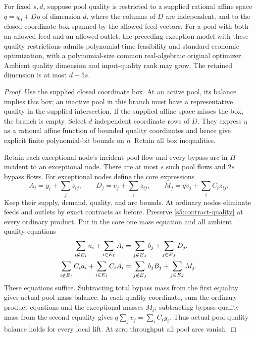 \begin{lemma}
\label{s5:quality-chart}
For fixed $s,d$, suppose pool quality is restricted to a supplied rational
affine space $q=q_0+D\eta$ of dimension $d$, where the columns of $D$
are independent, and to the closed coordinate box spanned by the allowed
feed vectors. For a pool with both an allowed feed and an allowed outlet,
the preceding exception model with these quality restrictions admits polynomial-time
feasibility and standard economic optimization, with a polynomial-size
common real-algebraic original optimizer. Ambient quality dimension and
input-quality rank may grow. The retained dimension is at most $d+5s$.
\end{lemma}
\begin{proof}
Use the supplied closed coordinate box. At an active pool, its balance
implies this box; an inactive pool in this branch must have
a representative quality in the supplied intersection. If the
supplied affine space misses the box, the branch is empty. Select $d$
independent coordinate rows of $D$. They express $\eta$ as a rational
affine function of bounded quality coordinates and hence give explicit
finite polynomial-bit bounds on $\eta$. Retain all box inequalities.

Retain each exceptional node's incident pool flow and every bypass arc
in $H$ incident to an exceptional node. There are at most $s$ such
pool flows and $2s$ bypass flows. For exceptional nodes define the core
expressions
\[
 A_i=y_i+\sum_jz_{ij},\qquad
 D_j=v_j+\sum_i z_{ij},\qquad M_j=qv_j+\sum_iC_i z_{ij}.
\]
Keep their supply, demand, quality, and arc bounds. At ordinary nodes
eliminate feeds and outlets by exact contracts as before. Preserve
\eqref{s5:contract-quality} at every ordinary product. Put in the core
one mass equation and all ambient quality equations
\begin{align}
 \sum_{i\notin E_I}a_i+\sum_{i\in E_I}A_i
 &=\sum_{j\notin E_J}b_j+\sum_{j\in E_J}D_j,\notag\\
 \sum_{i\notin E_I}C_i a_i+\sum_{i\in E_I}C_i A_i
 &=\sum_{j\notin E_J}b_jB_j+\sum_{j\in E_J}M_j.
 \label{s5:exception-balances}
\end{align}
These equations suffice. Subtracting total bypass mass
from the first equality gives actual pool mass balance. In each
quality coordinate, sum the ordinary product equations and the
exceptional masses $M_j$; subtracting bypass quality mass from the
second equality gives
$q\sum_jv_j=\sum_iC_i y_i$. Thus actual pool quality balance holds
for every local lift. At zero throughput all pool arcs vanish.


\end{proof}
